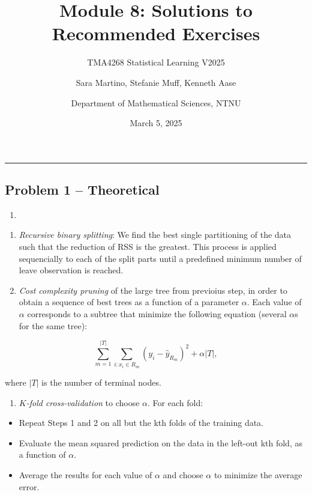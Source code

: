 \documentclass[
]{article}
\title{Module 8: Solutions to Recommended Exercises}
\subtitle{TMA4268 Statistical Learning V2025}
\author{Sara Martino, Stefanie Muff, Kenneth Aase \and Department of
Mathematical Sciences, NTNU}
\date{March 5, 2025}
\providecommand{\tightlist}{%
  \setlength{\itemsep}{0pt}\setlength{\parskip}{0pt}}
\begin{document}
\maketitle

\begin{center}\rule{0.5\linewidth}{0.5pt}\end{center}

\subsection{Problem 1 -- Theoretical}\label{problem-1-theoretical}

\begin{enumerate}
\def\labelenumi{\alph{enumi})}
\tightlist
\item
\end{enumerate}

\begin{enumerate}
\def\labelenumi{\arabic{enumi}.}
\item
  \emph{Recursive binary splitting}: We find the best single
  partitioning of the data such that the reduction of RSS is the
  greatest. This process is applied sequencially to each of the split
  parts until a predefined minimum number of leave observation is
  reached.
\item
  \emph{Cost complexity pruning} of the large tree from previoius step,
  in order to obtain a sequence of best trees as a function of a
  parameter \(\alpha\). Each value of \(\alpha\) corresponds to a
  subtree that minimize the following equation (several \(\alpha\)s for
  the same tree):
\end{enumerate}

\[
\sum_{m=1}^{|T|}\sum_{i:x_i\in R_m}(y_i - \hat y_{R_m})^2 + \alpha |T|,
\]

where \(|T|\) is the number of terminal nodes.

\begin{enumerate}
\def\labelenumi{\arabic{enumi}.}
\setcounter{enumi}{2}
\tightlist
\item
  \emph{\(K\)-fold cross-validation} to choose \(\alpha\). For each
  fold:
\end{enumerate}

\begin{itemize}
\tightlist
\item
  Repeat Steps 1 and 2 on all but the kth folds of the training data.
\item
  Evaluate the mean squared prediction on the data in the left-out kth
  fold, as a function of \(\alpha\).
\item
  Average the results for each value of \(\alpha\) and choose \(\alpha\)
  to minimize the average error.
\end{itemize}
\end{document}

